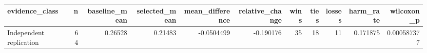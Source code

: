 \begin{tabular}{lrrrrrrrrrr}
\toprule
evidence_class & n & baseline_mean & selected_mean & mean_difference & relative_change & wins & ties & losses & harm_rate & wilcoxon_p \\
\midrule
Independent replication & 64 & 0.26528 & 0.21483 & -0.0504499 & -0.190176 & 35 & 18 & 11 & 0.171875 & 0.000587377 \\
\bottomrule
\end{tabular}
